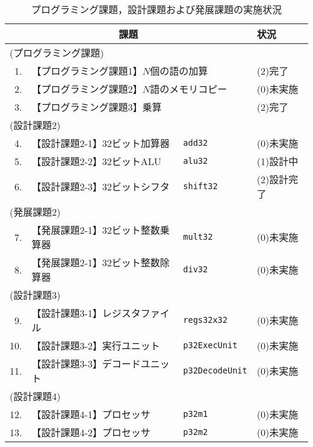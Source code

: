 \documentclass{jarticle}[11pt]
\begin{document}
    \begin{table}[tb]
    \caption{プログラミング課題，設計課題および発展課題の実施状況}
    \label{tab:プログラミング課題，設計課題および発展課題の実施状況}
    \begin{center}
    {\small
    \begin{tabular}{rll|l}
    \hline
    \hline
    \multicolumn{3}{c|}{課題} & 状況 \\
    \hline
    \multicolumn{3}{l|}{(プログラミング課題)} & \\
    1. & \multicolumn{2}{l|}{【プログラミング課題1】$N$個の語の加算 } & (2)完了 \\
    2. & \multicolumn{2}{l|}{【プログラミング課題2】$N$語のメモリコピー} & (0)未実施 \\
    3. & \multicolumn{2}{l|}{【プログラミング課題3】乗算} & (2)完了 \\
    \multicolumn{3}{l|}{(設計課題2)} & \\
    4. & 【設計課題2-1】32ビット加算器   & \verb|add32|          & (0)未実施 \\
    5. & 【設計課題2-2】32ビットALU      & \verb|alu32|          & (1)設計中 \\
    6. & 【設計課題2-3】32ビットシフタ   & \verb|shift32|        & (2)設計完了 \\
    \multicolumn{3}{l|}{(発展課題2)} & \\
    7. & 【発展課題2-1】32ビット整数乗算器 & \verb|mult32|       & (0)未実施 \\
    8. & 【発展課題2-1】32ビット整数除算器 & \verb|div32|        & (0)未実施 \\
    \multicolumn{3}{l|}{(設計課題3)} & \\
    9. & 【設計課題3-1】レジスタファイル & \verb|regs32x32|      & (0)未実施 \\
    10. & 【設計課題3-2】実行ユニット     & \verb|p32ExecUnit|    & (0)未実施 \\
    11. & 【設計課題3-3】デコードユニット & \verb|p32DecodeUnit|  & (0)未実施 \\
    \multicolumn{3}{l|}{(設計課題4)} & \\
    12. & 【設計課題4-1】プロセッサ      & \verb|p32m1|          & (0)未実施 \\
    13. & 【設計課題4-2】プロセッサ      & \verb|p32m2|          & (0)未実施 \\

\end{tabular}}
\end{center}
\end{table}
\end{document}
